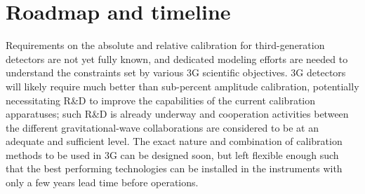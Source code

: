 \section{Roadmap and timeline}

Requirements on the absolute and relative calibration for third-generation detectors are not yet fully known, and dedicated modeling efforts are needed to understand the constraints set by various 3G scientific objectives. 3G detectors will likely require much better than sub-percent amplitude calibration, potentially necessitating R\&D to improve the capabilities of the current calibration apparatuses; such R\&D is already underway and cooperation activities between the different gravitational-wave collaborations are considered to be at an adequate and sufficient level. The exact nature and combination of calibration methods to be used in 3G can be designed soon, but left flexible enough such that the best performing technologies can be installed in the instruments with only a few years lead time before operations. 